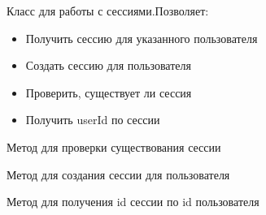 \documentclass[letterpaper,10pt,english]{sphinxmanual}
\begin{document}
\begin{fulllineitems}
\label{sessionManager:mainServer.sessionManager.SessionManager}
Класс для работы с сессиями.Позволяет:
\begin{itemize}
\item {} 
Получить сессию для указанного пользователя

\item {} 
Создать сессию для пользователя

\item {} 
Проверить, существует ли сессия

\item {} 
Получить userId по сессии

\end{itemize}

\begin{fulllineitems}
\label{sessionManager:mainServer.sessionManager.SessionManager.checkSession}
Метод для проверки существования сессии

\end{fulllineitems}


\begin{fulllineitems}
\label{sessionManager:mainServer.sessionManager.SessionManager.createSession}
Метод для создания сессии для пользователя

\end{fulllineitems}


\begin{fulllineitems}
\label{sessionManager:mainServer.sessionManager.SessionManager.getSessionID}
Метод для получения id сессии по id пользователя

\end{fulllineitems}



\end{fulllineitems}
\end{document}
